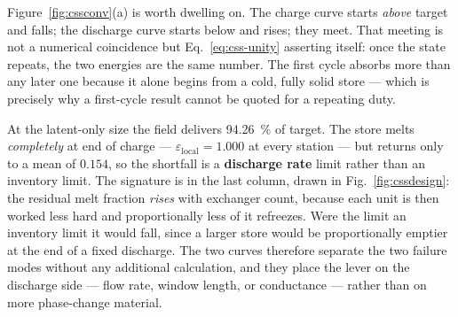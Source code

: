 Figure~\ref{fig:cssconv}(a) is worth dwelling on. The charge curve starts
\emph{above} target and falls; the discharge curve starts below and rises; they
meet. That meeting is not a numerical coincidence but
Eq.~\eqref{eq:css-unity} asserting itself: once the state repeats, the two
energies are the same number. The first cycle absorbs more than any later one
because it alone begins from a cold, fully solid store --- which is precisely
why a first-cycle result cannot be quoted for a repeating duty.

At the latent-only size the field delivers \SI{94.26}{\percent} of target. The
store melts \emph{completely} at end of charge --- $\varepsilon_{\mathrm{local}}
= 1.000$ at every station --- but returns only to a mean of $0.154$, so the
shortfall is a \textbf{discharge rate} limit rather than an inventory limit. The
signature is in the last column, drawn in Fig.~\ref{fig:cssdesign}: the residual
melt fraction \emph{rises} with exchanger count, because each unit is then
worked less hard and proportionally less of it refreezes. Were the limit an
inventory limit it would fall, since a larger store would be proportionally
emptier at the end of a fixed discharge. The two curves therefore separate the
two failure modes without any additional calculation, and they place the lever
on the discharge side --- flow rate, window length, or conductance --- rather
than on more phase-change material.
